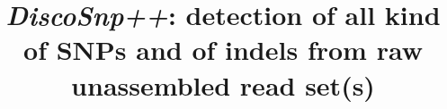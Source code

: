 \documentclass{bmcart}
\begin{document}
\begin{frontmatter}

\begin{fmbox}


\title{{\it DiscoSnp++}: detection of all kind of SNPs and of indels from raw unassembled read set(s)}


\author[
   addressref={aff1},                   %
   corref={aff1},                       %
   email={pierre.peterlongo@inria.fr}   %
]{ }
 \author[
    addressref={aff1},
    email={erwan.drezen@inria.fr}
 ]{ }
 \author[
    addressref={aff1},
    email={claire.lemaitre@inria.fr}
 ]{ }
 \author[
    addressref={aff1},
    email={chloe.riou@inria.fr}
 ]{ }


\address[id=aff1]{%
  , %
  ,                     %
  ,                              %
}


\end{fmbox}
\end{frontmatter}
\end{document}
